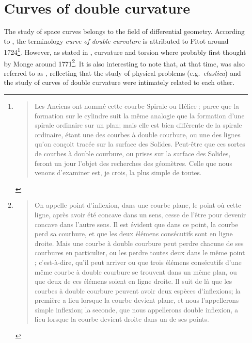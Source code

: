 
\section{Curves of double curvature}

The study of space curves belongs to the field of differential geometry. According to \cite[p.28]{Delcourt2007}, the terminology \emph{curve of double curvature} is attributed to Pitot around 1724\footnote{
\blockcquote[p.28]{Pitot1726}{
Les Anciens ont nommé cette courbe Spirale ou Hélice ; parce que la formation sur le cylindre suit la même analogie que la formation d’une spirale ordinaire sur un plan; mais elle est bien différente de la spirale ordinaire, étant une des courbes à double courbure, ou une des lignes qu’on conçoit tracée sur la surface des Solides. Peut-être que ces sortes de courbes à double courbure, ou prises sur la surface des Solides, feront un jour l’objet des recherches des géomètres. Celle que nous venons d’examiner est, je crois, la plus simple de toutes.
}}.
However, as stated in \cite[p.321]{Coolidge2013}, curvature and torsion where probably first thought by Monge around 1771\footnote{
\blockcquote[p.363]{Monge1809}{On appelle point d'inflexion, dans une courbe plane, le point où cette ligne, après avoir été concave dans un sens, cesse de l'être pour devenir concave dans l'autre sens. Il est évident que dans ce point, la courbe perd sa courbure, et que les deux élémens consécutifs sont en ligne droite. Mais une courbe à double courbure peut perdre chacune de ses courbures en particulier, ou les perdre toutes deux dans le même point ; c'est-à-dire, qu'il peut arriver ou que trois élémens consécutifs d'une même courbe à double courbure se trouvent dans un même plan, ou que deux de ces élémens soient en ligne droite. Il suit de là que les courbes à double courbure peuvent avoir deux espèces d'inflexions; la première a lieu lorsque la courbe devient plane, et nous l'appellerons simple inflexion; la seconde, que nous appellerons double inflexion, a lieu lorsque la courbe devient droite dans un de ses points.
}}. It is also interesting to note that, at that time,  was also referred to as , reflecting that the study of physical problems (e.g.\ \emph{elastica}) and the study of curves of double curvature were intimately related to each other.

